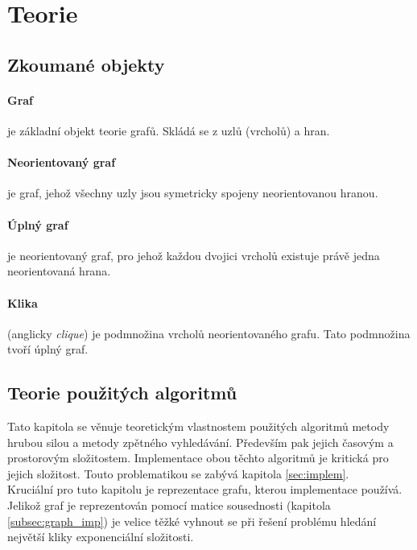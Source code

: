 \documentclass[a4paper]{article}
\begin{document}
\section{Teorie} \label{sec:teorie}
    \subsection{Zkoumané objekty}
        \paragraph{Graf} je základní objekt teorie grafů. Skládá se z uzlů (vrcholů) a hran.\cite{slu_zaklad-teo-grafu}
        
        \paragraph{Neorientovaný graf}
        je graf, jehož všechny uzly jsou symetricky spojeny neorientovanou hranou.\cite{slu_zaklad-teo-grafu}
        
        \paragraph{Úplný graf} je neorientovaný graf, pro jehož každou dvojici vrcholů existuje právě jedna neorientovaná hrana.\cite{slu_zaklad-teo-grafu}
        
        \paragraph{Klika} (anglicky \textit{clique}) je podmnožina vrcholů neorientovaného grafu. Tato podmnožina tvoří úplný graf.\cite{cliq-definition}

    \subsection{Teorie použitých algoritmů} \label{subsec:complexities_teo}
        Tato kapitola se věnuje teoretickým vlastnostem použitých algoritmů metody hrubou silou a metody zpětného vyhledávání. Především pak jejich časovým a prostorovým složitostem. Implementace obou těchto algoritmů je kritická pro jejich složitost. Touto problematikou se zabývá kapitola \ref{sec:implem}.\\

        \noindent
        Kruciální pro tuto kapitolu je reprezentace grafu, kterou implementace používá. Jelikož graf je reprezentován pomocí matice sousednosti (kapitola \ref{subsec:graph_imp}) je velice těžké vyhnout se při řešení problému hledání největší kliky exponenciální složitosti.
\end{document}
